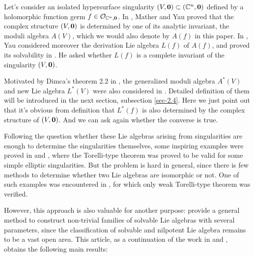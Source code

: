 

Let's consider an isolated hypersurface singularity $(V,{\boldsymbol 0})\subset \left({\mathbb{C}}^n,{\boldsymbol 0}\right)$ defined by a holomorphic function germ $f\in \mathcal O_{{\mathbb{C}}^n,{\boldsymbol 0}}$.
In \cite{MY},  Mather and Yau proved that  the complex structure $(V,{\boldsymbol 0})$ is determined by one of its analytic invariant, the moduli algebra $A(V)$, which we would also denote by $A(f)$ in this paper.
In \cite{Yau}, Yau considered moreover  the derivation Lie algebra $L(f)$ of $A(f)$, and proved its solvability in \cite{Yau5}. He asked whether $L(f)$ is a complete invariant of the singularity $(V,{\boldsymbol 0})$.

Motivated by Dimca's theorem 2.2 in \cite{Di}, the generalized moduli algebra $A^*(V)$ and new Lie algebra $L^*(V)$ were also considered in \cite{BN}. Detailed definition of them will be introduced in the next section, subsection \ref{sec-2.4}. Here we just point out that it's obvious from definition that $L^*(f)$ is also determined by the complex structure of  $(V,{\boldsymbol 0})$. And we can ask again whether the converse is true.

Following the question whether these Lie algebras arising from  singularities are enough to determine the singularities themselves, some inspiring examples were proved in \cite{SY} and \cite{BN}, where the Torelli-type theorem was proved to be valid for some simple elliptic singularities.  But the problem is hard in general, since there is few methods to determine whether two Lie algebras are isomorphic or not. One of such examples was encountered in \cite{BN}, for which only weak Torelli-type theorem was verified. 

However, this approach is also valuable for another purpose: provide a general method to construct non-trivial families of solvable Lie algebras with several parameters, since the classification of solvable and nilpotent Lie algebra remains to be a vast open area. This article, as a continuation of the work in 
\cite{SY} and \cite{BN}, obtains the following main results: 

